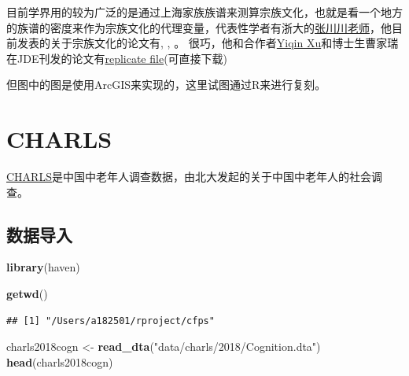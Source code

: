 \documentclass[
  oneside]{book}
\newenvironment{Shaded}{\begin{snugshade}}{\end{snugshade}}
\newcommand{\FunctionTok}[1]{\textcolor[rgb]{0.13,0.29,0.53}{\textbf{#1}}}
\newcommand{\NormalTok}[1]{#1}
\newcommand{\OtherTok}[1]{\textcolor[rgb]{0.56,0.35,0.01}{#1}}
\newcommand{\StringTok}[1]{\textcolor[rgb]{0.31,0.60,0.02}{#1}}
\begin{document}
目前学界用的较为广泛的是通过上海家族族谱来测算宗族文化，也就是看一个地方的族谱的密度来作为宗族文化的代理变量，代表性学者有浙大的\href{https://scholar.google.com/citations?user=_YWE1C4AAAAJ\&hl=en\&oi=ao}{张川川老师}，他目前发表的关于宗族文化的论文有\autocite{Cao2022}, \autocite{ZHANG2020100}, \autocite{ZhangKawagawa2017}。
很巧，他和合作者\href{https://yiqingxu.org/}{Yiqin Xu}和博士生曹家瑞在JDE刊发的论文有\href{https://yiqingxu.org/papers/english/2022_famine/replication.zip}{replicate file}(可直接下载)

但图中的图是使用ArcGIS来实现的，这里试图通过R来进行复刻。

\hypertarget{charls}{%
\chapter{CHARLS}\label{charls}}

\href{http://charls.pku.edu.cn/}{CHARLS}是中国中老年人调查数据，由北大发起的关于中国中老年人的社会调查。

\hypertarget{ux6570ux636eux5bfcux5165}{%
\section{数据导入}\label{ux6570ux636eux5bfcux5165}}

\begin{Shaded}
\begin{Highlighting}[]
\FunctionTok{library}\NormalTok{(haven)}
\end{Highlighting}
\end{Shaded}

\begin{Shaded}
\begin{Highlighting}[]
\FunctionTok{getwd}\NormalTok{()}
\end{Highlighting}
\end{Shaded}

\begin{verbatim}
## [1] "/Users/a182501/rproject/cfps"
\end{verbatim}

\begin{Shaded}
\begin{Highlighting}[]
\NormalTok{charls2018cogn }\OtherTok{\textless{}{-}} \FunctionTok{read\_dta}\NormalTok{(}\StringTok{"data/charls/2018/Cognition.dta"}\NormalTok{)}
\FunctionTok{head}\NormalTok{(charls2018cogn)}
\end{Highlighting}
\end{Shaded}
\end{document}
